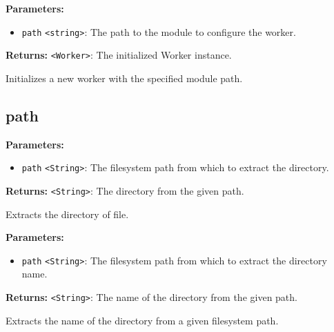 \documentclass[12pt,a4paper]{article}
\begin{document}
\vspace{5mm}
\noindent {}


\noindent \textbf{Parameters:}
\begin{itemize}
  \item \texttt{path} \texttt{<string>}: The path to the module to configure the worker.
\end{itemize}

\noindent \textbf{Returns:} \texttt{<Worker>}: The initialized Worker instance.

\noindent Initializes a new worker with the specified module path.


\subsection{path}
\vspace{5mm}
\noindent {}


\noindent \textbf{Parameters:}
\begin{itemize}
  \item \texttt{path} \texttt{<String>}: The filesystem path from which to extract the directory.
\end{itemize}

\noindent \textbf{Returns:} \texttt{<String>}: The directory from the given path.

\noindent Extracts the directory of file.

\vspace{5mm}
\noindent {}


\noindent \textbf{Parameters:}
\begin{itemize}
  \item \texttt{path} \texttt{<String>}: The filesystem path from which to extract the directory name.
\end{itemize}

\noindent \textbf{Returns:} \texttt{<String>}: The name of the directory from the given path.

\noindent Extracts the name of the directory from a given filesystem path.
\end{document}
